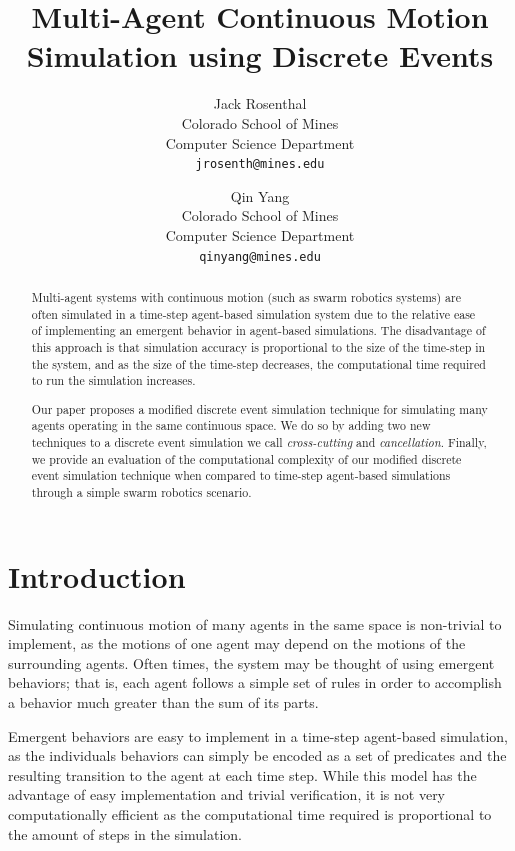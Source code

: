 \documentclass[conference,letterpaper]{IEEEtran}
\title{Multi-Agent Continuous Motion Simulation using Discrete Events}
\author{%
    Jack Rosenthal \\
    Colorado School of Mines \\
    Computer Science Department \\
    \texttt{jrosenth@mines.edu}
    \and
    Qin Yang \\
    Colorado School of Mines \\
    Computer Science Department \\
    \texttt{qinyang@mines.edu}}
\begin{document}
\maketitle
\thispagestyle{fancyplain}
\pagestyle{fancyplain}

\begin{abstract}
    Multi-agent systems with continuous motion (such as swarm robotics systems)
    are often simulated in a time-step agent-based simulation system due to the
    relative ease of implementing an emergent behavior in agent-based
    simulations. The disadvantage of this approach is that simulation accuracy
    is proportional to the size of the time-step in the system, and as the size
    of the time-step decreases, the computational time required to run the
    simulation increases.

    Our paper proposes a modified discrete event simulation technique for
    simulating many agents operating in the same continuous space. We do so by
    adding two new techniques to a discrete event simulation we call
    \emph{cross-cutting} and \emph{cancellation}. Finally, we provide an
    evaluation of the computational complexity of our modified discrete event
    simulation technique when compared to time-step agent-based simulations
    through a simple swarm robotics scenario.
\end{abstract}

\section{Introduction}

Simulating continuous motion of many agents in the same space is non-trivial to
implement, as the motions of one agent may depend on the motions of the
surrounding agents. Often times, the system may be thought of using emergent
behaviors; that is, each agent follows a simple set of rules in order to
accomplish a behavior much greater than the sum of its parts.

Emergent behaviors are easy to implement in a time-step agent-based simulation,
as the individuals behaviors can simply be encoded as a set of predicates and
the resulting transition to the agent at each time step. While this model has
the advantage of easy implementation and trivial verification, it is not very
computationally efficient as the computational time required is proportional to
the amount of steps in the simulation.
\end{document}
